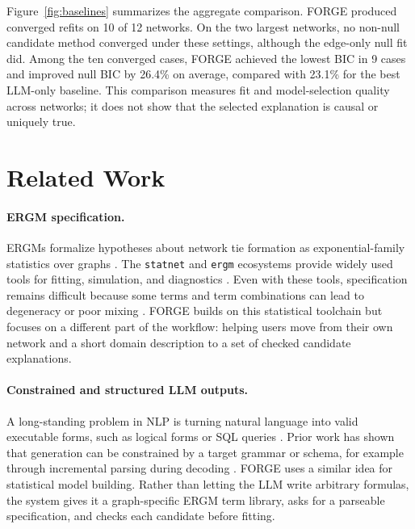 \documentclass[11pt]{article}
\begin{document}
Figure~\ref{fig:baselines} summarizes the aggregate comparison. FORGE produced converged refits on 10 of 12 networks. On the two largest networks, no non-null candidate method converged under these settings, although the edge-only null fit did. Among the ten converged cases, FORGE achieved the lowest BIC in 9 cases and improved null BIC by 26.4\% on average, compared with 23.1\% for the best LLM-only baseline. This comparison measures fit and model-selection quality across networks; it does not show that the selected explanation is causal or uniquely true.

\section{Related Work}
\label{sec:related}

\paragraph{ERGM specification.}
ERGMs formalize hypotheses about network tie formation as exponential-family statistics over graphs \citep{wasserman1996logit,robins2007introduction}. The \texttt{statnet} and \texttt{ergm} ecosystems provide widely used tools for fitting, simulation, and diagnostics \citep{handcock2008statnet,hunter2008ergm,krivitsky2023ergm4}. Even with these tools, specification remains difficult because some terms and term combinations can lead to degeneracy or poor mixing \citep{schweinberger2011instability}. FORGE builds on this statistical toolchain but focuses on a different part of the workflow: helping users move from their own network and a short domain description to a set of checked candidate explanations.

\paragraph{Constrained and structured LLM outputs.}
A long-standing problem in NLP is turning natural language into valid executable forms, such as logical forms or SQL queries \citep{berant2013semantic,yu2018spider}. Prior work has shown that generation can be constrained by a target grammar or schema, for example through incremental parsing during decoding \citep{scholak2021picard}. FORGE uses a similar idea for statistical model building. Rather than letting the LLM write arbitrary formulas, the system gives it a graph-specific ERGM term library, asks for a parseable specification, and checks each candidate before fitting.
\end{document}
